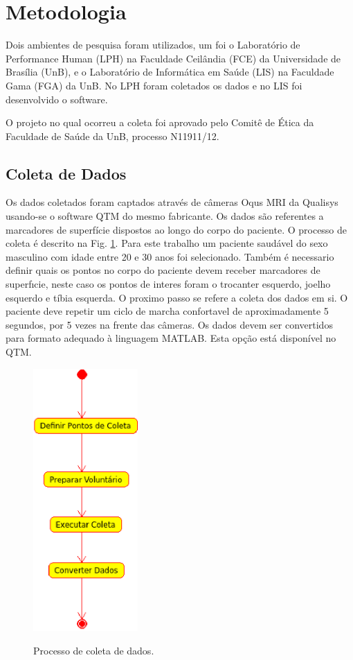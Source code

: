 \documentclass[journal]{IEEEtran}
\begin{document}



\section{Metodologia}
Dois ambientes de pesquisa foram utilizados, um foi o Laboratório de 
Performance Human (LPH) na Faculdade Ceilândia (FCE) 
da Universidade de Brasília (UnB), e o Laboratório de Informática em Saúde
(LIS) na Faculdade Gama (FGA) da UnB.
No LPH foram coletados os dados e no LIS foi desenvolvido o software.

O projeto no qual ocorreu a coleta foi aprovado pelo Comitê de Ética
da Faculdade de Saúde da UnB, processo N11911/12.

\subsection{Coleta de Dados}
Os dados coletados foram captados através de câmeras Oqus MRI da
Qualisys usando-se o software QTM do mesmo fabricante. 
Os dados são referentes a marcadores de superfície
dispostos ao longo do corpo do paciente.
O processo de coleta é descrito na Fig. \ref{coleta_dados}.
Para este trabalho um paciente saudável do sexo masculino com idade entre 20 e 30 anos
foi selecionado.
Também é necessario definir quais os pontos no corpo do paciente devem
receber marcadores de superfıcie, neste caso os pontos de interes foram o trocanter esquerdo, joelho esquerdo e tíbia esquerda. 
O proximo passo se refere a coleta dos dados em si. 
O paciente deve repetir um ciclo de marcha confortavel de aproximadamente 5 segundos,
por 5 vezes na frente das câmeras.
Os dados devem ser convertidos para formato adequado à linguagem
MATLAB. Esta opção está disponível no QTM. 
\begin{figure}[!t]
	\centering
	{\includegraphics[width=4cm]{coleta_dados}}
	\caption{Processo de coleta de dados.}
	\label{coleta_dados}
\end{figure}
\end{document}
